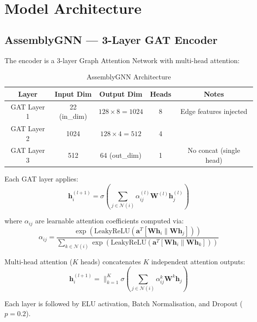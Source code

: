 \documentclass[12pt]{report}
\begin{document}
\section{Model Architecture}

\subsection{AssemblyGNN --- 3-Layer GAT Encoder}

The encoder is a 3-layer Graph Attention Network with multi-head attention:

\begin{table}[H]
\centering
\caption{AssemblyGNN Architecture}
\begin{tabular}{c c c c c}
\toprule
\textbf{Layer} & \textbf{Input Dim} & \textbf{Output Dim} & \textbf{Heads} & \textbf{Notes} \\
\midrule
GAT Layer 1 & 22 (in\_dim) & $128 \times 8 = 1024$ & 8 & Edge features injected \\
GAT Layer 2 & 1024 & $128 \times 4 = 512$ & 4 & \\
GAT Layer 3 & 512 & 64 (out\_dim) & 1 & No concat (single head) \\
\bottomrule
\end{tabular}
\end{table}

Each GAT layer applies:
\begin{equation}
\mathbf{h}_i^{(l+1)} = \sigma\left(\sum_{j \in \mathcal{N}(i)} \alpha_{ij}^{(l)} \mathbf{W}^{(l)} \mathbf{h}_j^{(l)}\right)
\end{equation}

where $\alpha_{ij}$ are learnable attention coefficients computed via:
\begin{equation}
\alpha_{ij} = \frac{\exp\left(\text{LeakyReLU}\left(\mathbf{a}^T [\mathbf{W}\mathbf{h}_i \| \mathbf{W}\mathbf{h}_j]\right)\right)}{\sum_{k \in \mathcal{N}(i)} \exp\left(\text{LeakyReLU}\left(\mathbf{a}^T [\mathbf{W}\mathbf{h}_i \| \mathbf{W}\mathbf{h}_k]\right)\right)}
\end{equation}

Multi-head attention ($K$ heads) concatenates $K$ independent attention outputs:
\begin{equation}
\mathbf{h}_i^{(l+1)} = \Big\|_{k=1}^{K} \sigma\left(\sum_{j \in \mathcal{N}(i)} \alpha_{ij}^{k} \mathbf{W}^k \mathbf{h}_j\right)
\end{equation}

Each layer is followed by ELU activation, Batch Normalisation, and Dropout ($p = 0.2$).
\end{document}
